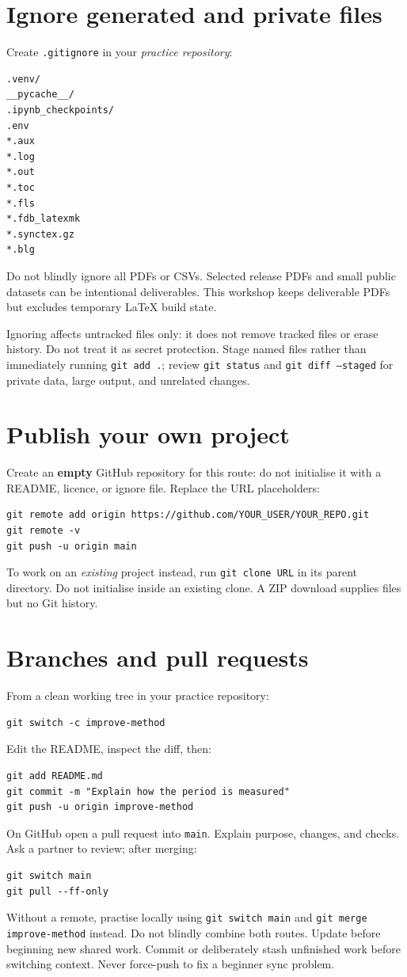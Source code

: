 \documentclass[11pt]{article}
\begin{document}
\section{Ignore generated and private files}
Create \texttt{.gitignore} in your \emph{practice repository}:
\begin{lstlisting}
.venv/
__pycache__/
.ipynb_checkpoints/
.env
*.aux
*.log
*.out
*.toc
*.fls
*.fdb_latexmk
*.synctex.gz
*.blg
\end{lstlisting}
Do not blindly ignore all PDFs or CSVs. Selected release PDFs and small public
datasets can be intentional deliverables. This workshop keeps deliverable
PDFs but excludes temporary LaTeX build state.

Ignoring affects untracked files only: it does not remove tracked files or
erase history. Do not treat it as secret protection.
Stage named files rather than immediately running \texttt{git add .};
review \texttt{git status} and \texttt{git diff --staged} for private data,
large output, and unrelated changes.

\section{Publish your own project}
Create an \textbf{empty} GitHub repository for this route: do not initialise it
with a README, licence, or ignore file. Replace the URL placeholders:
\begin{lstlisting}
git remote add origin https://github.com/YOUR_USER/YOUR_REPO.git
git remote -v
git push -u origin main
\end{lstlisting}
To work on an \emph{existing} project instead, run \texttt{git clone URL}
in its parent directory. Do not initialise inside an existing clone.
A ZIP download supplies files but no Git history.

\section{Branches and pull requests}
From a clean working tree in your practice repository:
\begin{lstlisting}
git switch -c improve-method
\end{lstlisting}
Edit the README, inspect the diff, then:
\begin{lstlisting}
git add README.md
git commit -m "Explain how the period is measured"
git push -u origin improve-method
\end{lstlisting}
On GitHub open a pull request into \texttt{main}. Explain purpose, changes,
and checks. Ask a partner to review; after merging:
\begin{lstlisting}
git switch main
git pull --ff-only
\end{lstlisting}
Without a remote, practise locally using \texttt{git switch main} and
\texttt{git merge improve-method} instead. Do not blindly combine both routes.
Update before beginning new shared work. Commit or deliberately stash unfinished
work before switching context. Never force-push to fix a beginner sync problem.
\end{document}
